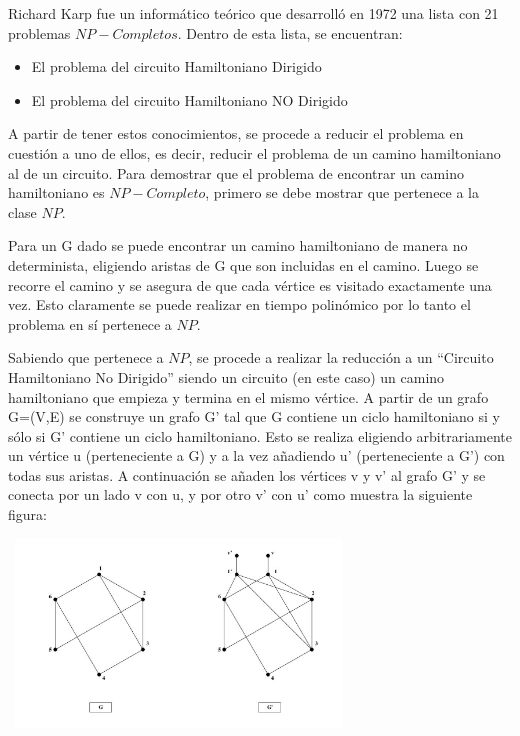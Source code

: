 \documentclass{article}
\newcommand\tab[1][0.5cm]{\hspace*{#1}}
\begin{document}
\begin{enumerate}
            \tab Richard Karp fue un informático teórico que desarrolló en 1972 una lista con 21 problemas $NP-Completos$.
            Dentro de esta lista, se encuentran:
            \begin{itemize}
              \item El problema del circuito Hamiltoniano Dirigido
              \item El problema del circuito Hamiltoniano NO Dirigido
            \end{itemize}

            \tab A partir de tener estos conocimientos, se procede a reducir el problema en cuestión a uno de ellos, es decir,
             reducir el problema de un camino hamiltoniano al de un circuito. Para demostrar que el problema de encontrar un
             camino hamiltoniano es $NP-Completo$, primero se debe mostrar que pertenece a la clase $NP$.

             \tab Para un G dado se puede encontrar un camino hamiltoniano de manera no determinista, eligiendo aristas de G que son
             incluidas en el camino. Luego se recorre el camino y se asegura de que cada vértice es visitado exactamente una vez.
             Esto claramente se puede realizar en tiempo polinómico por lo tanto el problema en sí pertenece a $NP$.

             \tab Sabiendo que pertenece a $NP$, se procede a realizar la reducción a un “Circuito Hamiltoniano No Dirigido” siendo un
             circuito (en este caso) un camino hamiltoniano que empieza y termina en el mismo vértice. A partir de un grafo
             G=(V,E) se construye un grafo G’ tal que G contiene un ciclo hamiltoniano si y sólo si  G’ contiene un ciclo hamiltoniano.
             Esto se realiza eligiendo arbitrariamente un vértice u (perteneciente a G) y a la vez añadiendo u’ (perteneciente a G’)
             con todas sus aristas. A continuación se añaden los vértices v y v’ al grafo G’ y se conecta por un lado v con u, y por otro v’
             con u’ como muestra la siguiente figura:

             \begin{center}
                 \includegraphics[width=9cm, height=5cm]{images/p3}
             \end{center}


\end{enumerate}
\end{document}
